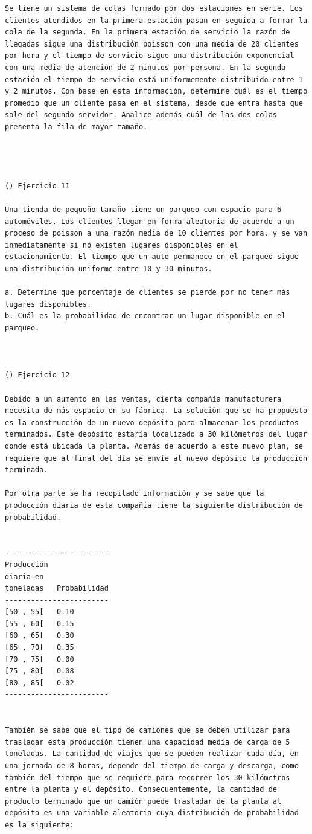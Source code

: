 \begin{verbatim}
Se tiene un sistema de colas formado por dos estaciones en serie. Los clientes atendidos en la primera estación pasan en seguida a formar la cola de la segunda. En la primera estación de servicio la razón de llegadas sigue una distribución poisson con una media de 20 clientes por hora y el tiempo de servicio sigue una distribución exponencial con una media de atención de 2 minutos por persona. En la segunda estación el tiempo de servicio está uniformemente distribuido entre 1 y 2 minutos. Con base en esta información, determine cuál es el tiempo promedio que un cliente pasa en el sistema, desde que entra hasta que sale del segundo servidor. Analice además cuál de las dos colas presenta la fila de mayor tamaño.




() Ejercicio 11

Una tienda de pequeño tamaño tiene un parqueo con espacio para 6 automóviles. Los clientes llegan en forma aleatoria de acuerdo a un proceso de poisson a una razón media de 10 clientes por hora, y se van inmediatamente si no existen lugares disponibles en el estacionamiento. El tiempo que un auto permanece en el parqueo sigue una distribución uniforme entre 10 y 30 minutos.

a. Determine que porcentaje de clientes se pierde por no tener más lugares disponibles.
b. Cuál es la probabilidad de encontrar un lugar disponible en el parqueo.



() Ejercicio 12

Debido a un aumento en las ventas, cierta compañía manufacturera necesita de más espacio en su fábrica. La solución que se ha propuesto es la construcción de un nuevo depósito para almacenar los productos terminados. Este depósito estaría localizado a 30 kilómetros del lugar donde está ubicada la planta. Además de acuerdo a este nuevo plan, se requiere que al final del día se envíe al nuevo depósito la producción terminada.

Por otra parte se ha recopilado información y se sabe que la producción diaria de esta compañía tiene la siguiente distribución de probabilidad.


------------------------
Producción
diaria en
toneladas   Probabilidad
------------------------
[50 , 55[   0.10
[55 , 60[   0.15
[60 , 65[   0.30
[65 , 70[   0.35
[70 , 75[   0.00
[75 , 80[   0.08
[80 , 85[   0.02
------------------------


También se sabe que el tipo de camiones que se deben utilizar para trasladar esta producción tienen una capacidad media de carga de 5 toneladas. La cantidad de viajes que se pueden realizar cada día, en una jornada de 8 horas, depende del tiempo de carga y descarga, como también del tiempo que se requiere para recorrer los 30 kilómetros entre la planta y el depósito. Consecuentemente, la cantidad de producto terminado que un camión puede trasladar de la planta al depósito es una variable aleatoria cuya distribución de probabilidad es la siguiente:



\end{verbatim}
